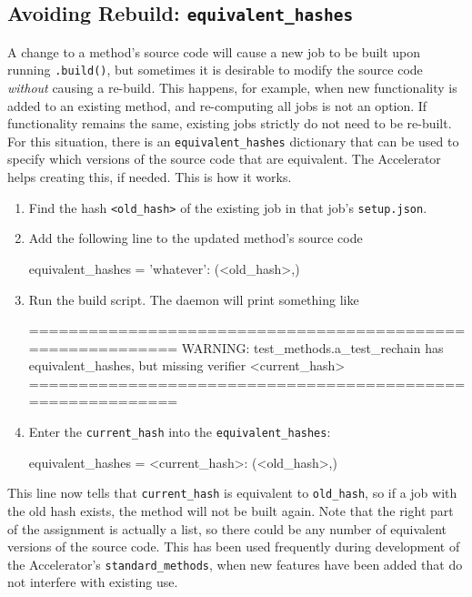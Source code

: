 \subsection{Avoiding Rebuild: \texttt{equivalent\_hashes}}
\label{sec:equivalent_hashes}

A change to a method's source code will cause a new job to be built
upon running \texttt{.build()}, but sometimes it is
desirable to modify the source code \textsl{without} causing a
re-build.  This happens, for example, when new functionality is added
to an existing method, and re-computing all jobs is not an option.  If
functionality remains the same, existing jobs strictly do not need to
be re-built.  For this situation, there is an
\texttt{equivalent\_hashes} dictionary that can be used to specify
which versions of the source code that are equivalent.  The
Accelerator helps creating this, if needed.  This is how it works.
\begin{enumerate}
\item Find the hash \texttt{<old\_hash>} of the existing job in that
  job's \texttt{setup.json}.
\item Add the following line to the updated method's source code
\begin{python}
equivalent_hashes = {'whatever': (<old_hash>,)}
\end{python}
\item Run the build script.  The daemon will print something like
\begin{shell}
===========================================================
WARNING: test_methods.a_test_rechain has equivalent_hashes,
but missing verifier <current_hash>
===========================================================
\end{shell}
\item Enter the \texttt{current\_hash} into the
  \texttt{equivalent\_hashes}:
\begin{python}
equivalent_hashes = {<current_hash>: (<old_hash>,)}
\end{python}
\end{enumerate}
This line now tells that \texttt{current\_hash} is equivalent to
\texttt{old\_hash}, so if a job with the old hash exists, the method
will not be built again.  Note that the right part of the assignment
is actually a list, so there could be any number of equivalent
versions of the source code.  This has been used frequently during
development of the Accelerator's \texttt{standard\_methods}, when new
features have been added that do not interfere with existing use.



